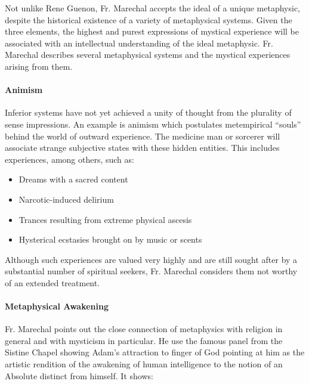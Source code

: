 Not unlike Rene Guenon, Fr. Marechal accepts the ideal of a unique metaphysic, despite the historical existence of a variety of metaphysical systems. Given the three elements, the highest and purest expressions of mystical experience will be associated with an intellectual understanding of the ideal metaphysic. Fr. Marechal describes several metaphysical systems and the mystical experiences arising from them.

\paragraph{Animism}


Inferior systems have not yet achieved a unity of thought from the plurality of sense impressions. An example is animism which postulates metempirical ``souls'' behind the world of outward experience. The medicine man or sorcerer will associate strange subjective states with these hidden entities. This includes experiences, among others, such as:

\begin{itemize}


\item Dreams with a sacred content

\item Narcotic-induced delirium

\item Trances resulting from extreme physical ascesis

\item Hysterical ecstasies brought on by music or scents
\end{itemize}


Although such experiences are valued very highly and are still sought after by a substantial number of spiritual seekers, Fr. Marechal considers them not worthy of an extended treatment.

\paragraph{Metaphysical Awakening}


\hfill\break

Fr. Marechal points out the close connection of metaphysics with religion in general and with mysticism in particular. He use the famous panel from the Sistine Chapel showing Adam's attraction to finger of God pointing at him as the artistic rendition of the awakening of human intelligence to the notion of an Absolute distinct from himself. It shows:

